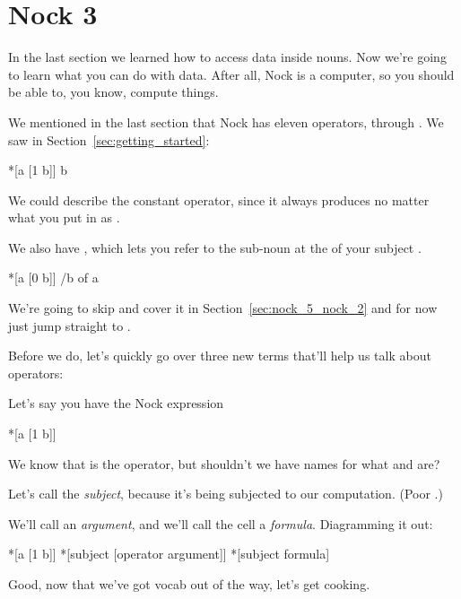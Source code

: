 \section{Nock 3}

\label{sec:nock_3}

In the last section we learned how to access data inside nouns. Now we're going
to learn what you can do with data. After all, Nock is a computer, so you
should be able to, you know, compute things.

We mentioned in the last section that Nock has eleven operators,  through
. We saw  in Section~\ref{sec:getting_started}:
\begin{code}
*[a [1 b]]                  b
\end{code}
We could describe  the constant operator, since it always produces 
no matter what you put in as .

We also have , which lets you refer to the sub-noun at the  of
your subject .
\begin{code}
*[a [0 b]]               /b of a
\end{code}
We're going to skip  and cover it in Section~\ref{sec:nock_5_nock_2} and for now just jump
straight to .

Before we do, let's quickly go over three new terms that'll help us talk about
operators:

Let's say you have the Nock expression
\begin{code}
*[a [1 b]]
\end{code}
We know that  is the operator, but shouldn't we have names for what  and
 are?

Let's call  the \emph{subject}, because it's being subjected to our computation.
(Poor .)

We'll call  an \emph{argument}, and we'll call the cell \kode{[1 b]} a \emph{formula}.
Diagramming it out:
\begin{code}
*[a [1 b]]
*[subject [operator argument]]
*[subject formula]
\end{code}
Good, now that we've got vocab out of the way, let's get cooking.

